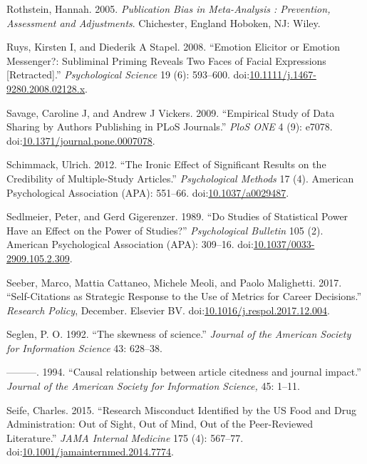 \documentclass[a5paper]{book}
\begin{document}
\hypertarget{ref-isbn:9780470870150}{}
Rothstein, Hannah. 2005. \emph{Publication Bias in Meta-Analysis :
Prevention, Assessment and Adjustments}. Chichester, England Hoboken,
NJ: Wiley.

\hypertarget{ref-doi:10.1111ux2fj.1467-9280.2008.02128.x}{}
Ruys, Kirsten I, and Diederik A Stapel. 2008. ``Emotion Elicitor or
Emotion Messenger?: Subliminal Priming Reveals Two Faces of Facial
Expressions {[}Retracted{]}.'' \emph{Psychological Science} 19 (6):
593--600.
doi:\href{https://doi.org/10.1111/j.1467-9280.2008.02128.x}{10.1111/j.1467-9280.2008.02128.x}.

\hypertarget{ref-doi:10.1371ux2fjournal.pone.0007078}{}
Savage, Caroline J, and Andrew J Vickers. 2009. ``Empirical Study of
Data Sharing by Authors Publishing in PLoS Journals.'' \emph{PloS ONE} 4
(9): e7078.
doi:\href{https://doi.org/10.1371/journal.pone.0007078}{10.1371/journal.pone.0007078}.

\hypertarget{ref-doi:10.1037ux2fa0029487}{}
Schimmack, Ulrich. 2012. ``The Ironic Effect of Significant Results on
the Credibility of Multiple-Study Articles.'' \emph{Psychological
Methods} 17 (4). American Psychological Association (APA): 551--66.
doi:\href{https://doi.org/10.1037/a0029487}{10.1037/a0029487}.

\hypertarget{ref-doi:10.1037ux2f0033-2909.105.2.309}{}
Sedlmeier, Peter, and Gerd Gigerenzer. 1989. ``Do Studies of Statistical
Power Have an Effect on the Power of Studies?'' \emph{Psychological
Bulletin} 105 (2). American Psychological Association (APA): 309--16.
doi:\href{https://doi.org/10.1037/0033-2909.105.2.309}{10.1037/0033-2909.105.2.309}.

\hypertarget{ref-doi:10.1016ux2fj.respol.2017.12.004}{}
Seeber, Marco, Mattia Cattaneo, Michele Meoli, and Paolo Malighetti.
2017. ``Self-Citations as Strategic Response to the Use of Metrics for
Career Decisions.'' \emph{Research Policy}, December. Elsevier BV.
doi:\href{https://doi.org/10.1016/j.respol.2017.12.004}{10.1016/j.respol.2017.12.004}.

\hypertarget{ref-Seglen1992}{}
Seglen, P. O. 1992. ``The skewness of science.'' \emph{Journal of the
American Society for Information Science} 43: 628--38.

\hypertarget{ref-Seglen1994}{}
---------. 1994. ``Causal relationship between article citedness and
journal impact.'' \emph{Journal of the American Society for Information
Science,} 45: 1--11.

\hypertarget{ref-doi:10.1001ux2fjamainternmed.2014.7774}{}
Seife, Charles. 2015. ``Research Misconduct Identified by the US Food
and Drug Administration: Out of Sight, Out of Mind, Out of the
Peer-Reviewed Literature.'' \emph{JAMA Internal Medicine} 175 (4):
567--77.
doi:\href{https://doi.org/10.1001/jamainternmed.2014.7774}{10.1001/jamainternmed.2014.7774}.
\end{document}
